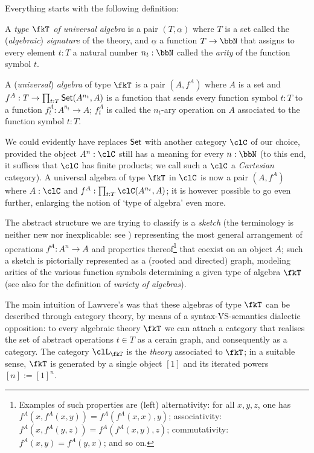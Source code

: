Everything starts with the following definition:
\begin{definition}\label{unialg}
    A \emph{type $\fkT$ of universal algebra} is a pair $(T,\underline{\alpha})$ where $T$ is a set called the (\emph{algebraic}) \emph{signature} of the theory, and $\underline\alpha$ a function $T \to \bbN$ that assigns to every element $t: T$ a natural number $n_t: \bbN$ called the \emph{arity} of the function symbol $t$.
\end{definition}
\begin{definition}
    A (\emph{universal}) \emph{algebra} of type $\fkT$ is a pair $(A,f^A)$ where $A$ is a set and $f^A: T \to \prod_{t: T} \mathsf{Set}(A^{n_t},A )$ is a function that sends every function symbol $t: T$ to a function $f^A_t: A^{n_t} \to A$; $f^A_t$ is called the $n_t$-ary operation on $A$ associated to the function symbol $t: T$.
\end{definition}
We could evidently have replaces $\mathsf{Set}$ with another category $\clC$ of our choice, provided the object $A^n: \clC$ still has a meaning for every $n: \bbN$ (to this end, it suffices that $\clC$ has finite products; we call such a $\clC$ a \emph{Cartesian} category). A universal algebra of type $\fkT$ in $\clC$ is now a pair $(A,f^A)$ where $A: \clC$ and $f^A: \prod_{t: T} \clC(A^{n_t},A )$; it is however possible to go even further, enlarging the notion of `type of algebra' even more.

The abstract structure we are trying to classify is a \emph{sketch} (the terminology is neither new nor inexplicable: see \cite{ehresmann1968esquisses,coppey1984leccons, Bor2}) representing the most general arrangement of operations $f^A: A^n \to A$ and properties thereof\footnote{Examples of such properties are (left) alternativity: for all $x,y,z$, one has $f^A(x,f^A(x,y)) = f^A(f^A(x,x),y)$; associativity: $f^A(x,f^A(y,z)) = f^A(f^A(x,y),z)$; commutativity: $f^A(x,y)=f^A(y,x)$; and so on.} that coexist on an object $A$; such a sketch is pictorially represented as a (rooted and directed) graph, modeling arities of the various function symbols determining a given type of algebra $\fkT$ (see also \cite[XV.3]{grillet2007abstract} for the definition of \emph{variety of algebras}).

The main intuition of Lawvere's \cite{lawvere1963functorial} was that these algebras of type $\fkT$ can be described through category theory, by means of a syntax-VS-semantics dialectic opposition: to every algebraic theory $\fkT$ we can attach a category that realises the set of abstract operations $t\in T$ as a cerain graph, and consequently as a category. The category $\clL_\fkT$ is the \emph{theory} associated to $\fkT$; in a suitable sense, $\fkT$ is generated by a single object $[1]$ and its iterated powers $[n] := [1]^n$. 

